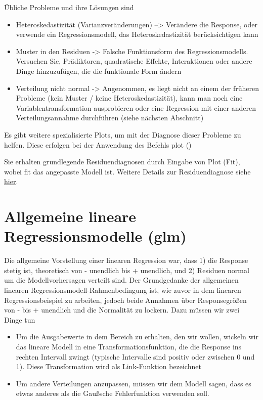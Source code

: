 \documentclass[a4paper,twoside]{tufte-book}\usepackage[]{graphicx}\usepackage[]{color}
\begin{document}
Übliche Probleme und ihre Lösungen sind  

\begin{itemize}
  \item Heteroskedastizität (Varianzveränderungen) --> Verändere die Response, oder verwende ein Regressionsmodell, das Heteroskedastizität berücksichtigen kann
  \item Muster in den Residuen -> Falsche Funktionsform des Regressionsmodells. Versuchen Sie, Prädiktoren, quadratische Effekte, Interaktionen oder andere Dinge hinzuzufügen, die die funktionale Form ändern
  \item Verteilung nicht normal -> Angenommen, es liegt nicht an einem der früheren Probleme (kein Muster / keine Heteroskedastizität), kann man noch eine Variablentransformation ausprobieren oder eine Regression mit einer anderen Verteilungsannahme durchführen (siehe nächsten Abschnitt)
\end{itemize}  

Es gibt weitere spezialisierte Plots, um mit der Diagnose dieser Probleme zu helfen. Diese erfolgen bei der Anwendung des Befehls plot ()


Sie erhalten grundlegende Residuendiagnosen durch Eingabe von Plot (Fit), wobei fit das angepasste Modell ist. Weitere Details zur Residuendiagnose siehe \href{http://www.statmethods.net/stats/rdiagnostics.html}{hier}.



\section{Allgemeine lineare Regressionsmodelle (glm)}

Die allgemeine Vorstellung einer linearen Regression war, dass 1) die Response stetig ist, theoretisch von - unendlich bis + unendlich, und 2) Residuen normal um die Modellvorhersagen verteilt sind. Der Grundgedanke der allgemeinen linearen Regressionsmodell-Rahmenbedingung ist, wie zuvor in dem linearen Regressionsbeispiel zu arbeiten, jedoch beide Annahmen über Responsegrößen von - bis + unendlich und die Normalität zu lockern. Dazu müssen wir zwei Dinge tun

\begin{itemize}
  \item Um die Ausgabewerte in dem Bereich zu erhalten, den wir wollen, wickeln wir das lineare Modell in eine Transformationsfunktion, die die Response ins rechten Intervall zwingt (typische Intervalle sind positiv oder zwischen 0 und 1). Diese Transformation wird als Link-Funktion bezeichnet
  \item Um andere Verteilungen anzupassen, müssen wir dem Modell sagen, dass es etwas anderes als die Gaußsche Fehlerfunktion verwenden soll.
\end{itemize}    
   
\end{document}
